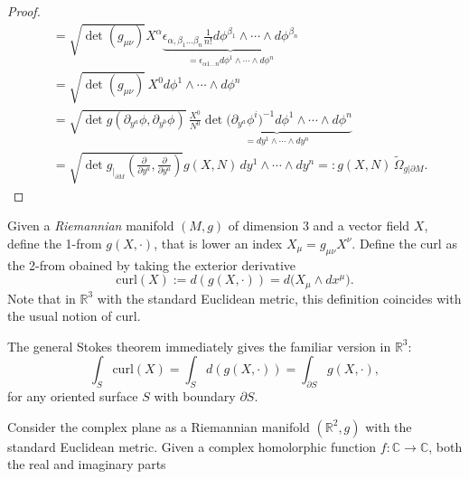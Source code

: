 \begin{proof}
{\begin{align}
    &= \sqrt{\det(g_{\mu \nu})} X^\alpha \underbrace{\epsilon_{\alpha,\beta_1\dots\beta_n}  \frac{1}{n!} d\phi^{\beta_1} \wedge \cdots \wedge d\phi^{\beta_n}}_{=\epsilon_{\alpha 1 \dots n} d\phi^1\wedge \cdots \wedge d\phi^n}\\
    &= \sqrt{\det(g_{\mu \nu})}\, X^0 d\phi^1\wedge \cdots \wedge d\phi^n\\
    &= \sqrt{\det g(\partial_{y^a} \phi, \partial_{y^b} \phi)}\, \frac{X^0}{N^0} \underbrace{\det\big(\partial_{y^a}\phi^i\big)^{-1} d\phi^1\wedge \cdots \wedge d\phi^n}_{=dy^1 \wedge \cdots \wedge dy^n}\\
    &= \sqrt{\det g_{|_{\partial M}}(\tfrac{\partial}{\partial y^a},\tfrac{\partial}{\partial y^a})} g(X,N) \, dy^1 \wedge \cdots \wedge dy^n =: g(X,N)\, \tilde{\Omega}_{g|\partial M}.
\end{align}
}
\end{proof}


\begin{mytheorem}
Given a \emph{Riemannian} manifold $(M,g)$ of dimension $3$ and a vector field $X$, define the 1-from $g(X,\cdot)$, that is lower an index $X_\mu=g_{\mu \nu} X^{\nu}$.
Define the curl as the 2-from obained by taking the exterior derivative
\begin{equation}
    \mathrm{curl} (X) := d (g(X,\cdot)) = d \Big(X_{\mu} \wedge dx^{\mu}\Big).
\end{equation}
Note that in $\mathbb{R}^3$ with the standard Euclidean metric, this definition coincides with the usual notion of curl.
\smallskip

The general Stokes theorem immediately gives the familiar version in $\mathbb{R}^3$:
\begin{equation}
    \int_S \mathrm{curl} (X) =\int_S d (g(X,\cdot)) = \int_{\partial S} g(X,\cdot),
\end{equation}
for any oriented surface $S$ with boundary $\partial S$.
\end{mytheorem}


\begin{mytheorem}
Consider the complex plane as a Riemannian manifold $(\mathbb{R}^2, g)$ with the standard Euclidean metric.
Given a complex homolorphic function $f: \mathbb{C} \to \mathbb{C}$, both the real and imaginary parts 
\end{mytheorem}



